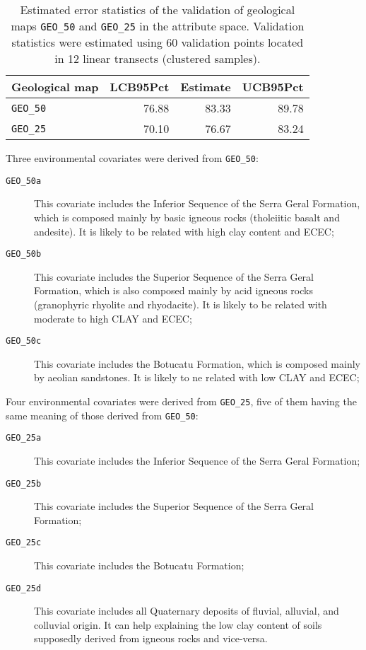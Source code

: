 \begin{table}[ht]
  \caption{Estimated error statistics of the validation of geological maps \texttt{GEO\_50} and \texttt{GEO\_25} in the attribute space. Validation statistics were estimated using 60 validation points located in 12 linear transects (clustered samples).}
  \label{tab:geology-attr-val}
  \centering
  \begin{tabular}{lrrr}
    \hline
    Geological map        & LCB95Pct & Estimate & UCB95Pct \\
    \hline
    \texttt{GEO\_50}      & 76.88    & 83.33    & 89.78    \\
    \texttt{GEO\_25}      & 70.10    & 76.67    & 83.24    \\
    \hline
  \end{tabular}
\end{table}

Three environmental covariates were derived from \texttt{GEO\_50}:

\begin{description}
  \item[\texttt{GEO\_50a}] This covariate includes the Inferior Sequence of the Serra Geral Formation, which is composed mainly by basic igneous rocks (tholeiitic basalt and andesite). It is likely to be related with high clay content and ECEC;
 
  \item[\texttt{GEO\_50b}] This covariate includes the Superior Sequence of the Serra Geral Formation, which is also composed mainly by acid  igneous rocks (granophyric rhyolite and rhyodacite). It is likely to be related with moderate to high CLAY and ECEC;
 
  \item[\texttt{GEO\_50c}] This covariate includes the Botucatu Formation, which is composed mainly by aeolian sandstones. It is likely to ne related with low CLAY and ECEC;
\end{description}

Four environmental covariates were derived from \texttt{GEO\_25}, five of them having the same meaning of those derived from \texttt{GEO\_50}:

\begin{description}
  \item[\texttt{GEO\_25a}] This covariate includes the Inferior Sequence of the Serra Geral Formation;
 
  \item[\texttt{GEO\_25b}] This covariate includes the Superior Sequence of the Serra Geral Formation;
 
  \item[\texttt{GEO\_25c}] This covariate includes the Botucatu Formation;
 
  \item[\texttt{GEO\_25d}] This covariate includes all Quaternary deposits of fluvial, alluvial, and colluvial origin. It can help explaining the low clay content of soils supposedly derived from igneous rocks and vice-versa.
\end{description}

